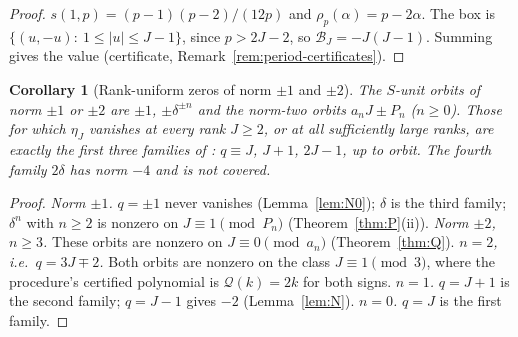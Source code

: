 \documentclass[11pt]{article}
\newtheorem{corollary}[theorem]{Corollary}
\theoremstyle{definition}
\begin{document}
\begin{proof}
$s(1,p)=(p-1)(p-2)/(12p)$ and $\rho_p(\alpha)=p-2\alpha$.  The box is
$\{(u,-u):\ 1\leq|u|\leq J-1\}$, since $p>2J-2$, so
$\mathcal B_J=-J(J-1)$.  Summing gives the value (certificate,
Remark~\ref{rem:period-certificates}).
\end{proof}

\begin{corollary}[Rank-uniform zeros of norm $\pm1$ and $\pm2$]
\label{cor:R}
The $S$-unit orbits of norm $\pm1$ or $\pm2$ are $\pm1$,
$\pm\delta^{\pm n}$ and the norm-two orbits $a_nJ\pm P_n$ ($n\geq0$).
Those for which $\eta_J$ vanishes at every rank $J\geq2$, or at all
sufficiently large ranks, are exactly the first three families of
\cite[Thm.~7.1]{MahmoodP1Collection2026}: $q\equiv J$, $J+1$, $2J-1$, up
to orbit.  The fourth family $2\delta$ has norm $-4$ and is not covered.
\end{corollary}

\begin{proof}
\emph{Norm $\pm1$.}  $q=\pm1$ never vanishes (Lemma~\ref{lem:N0});
$\delta$ is the third family; $\delta^n$ with $n\geq2$ is nonzero on
$J\equiv1\pmod{P_n}$ (Theorem~\ref{thm:P}(ii)).
\emph{Norm $\pm2$, $n\geq3$.}  These orbits are nonzero on
$J\equiv0\pmod{a_n}$ (Theorem~\ref{thm:Q}).
\emph{$n=2$, i.e.\ $q=3J\mp2$.}  Both orbits are nonzero on the class
$J\equiv1\pmod3$, where the procedure's certified polynomial is
$\mathcal Q(k)=2k$ for both signs.
\emph{$n=1$.}  $q=J+1$ is the second family; $q=J-1$ gives $-2$
(Lemma~\ref{lem:N}).
\emph{$n=0$.}  $q=J$ is the first family.
\end{proof}
\end{document}
